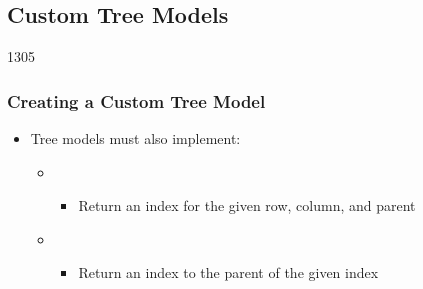 %
%
%
%

\subsection{Custom Tree Models}

\begin{slide}{1305}\frametitle{Creating a Custom Tree Model}
  \begin{itemize}
  \item Tree models must also implement:
    \begin{itemize}
    \item {}
       \begin{itemize}
       \item Return an index for the given row, column, and parent
       \end{itemize}
    \item {}
       \begin{itemize}
       \item Return an index to the parent of the given index
       \end{itemize}
    \end{itemize}
  \end{itemize}
\end{slide}


